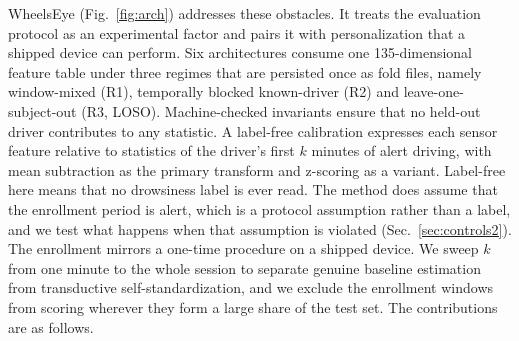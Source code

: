 \documentclass[journal]{IEEEtran}
\newcommand{\sysname}{WheelsEye}
\newcommand{\rone}{R1}
\newcommand{\rtwo}{R2}
\newcommand{\rthree}{R3}
\begin{document}
\sysname{} (Fig.~\ref{fig:arch}) addresses these obstacles. It treats the
evaluation protocol as an experimental factor and pairs it with
personalization that a shipped device can perform. Six architectures consume
one 135-dimensional feature table under three regimes that are persisted once
as fold files, namely window-mixed (\rone), temporally blocked known-driver
(\rtwo) and leave-one-subject-out (\rthree, LOSO). Machine-checked invariants
ensure that no held-out driver contributes to any statistic. A label-free
calibration expresses each sensor feature relative to statistics of the
driver's first $k$ minutes of alert driving, with mean subtraction as the
primary transform and z-scoring as a variant. Label-free here means that no
drowsiness label is ever read. The method does assume that the enrollment
period is alert, which is a protocol assumption rather than a label, and we
test what happens when that assumption is violated
(Sec.~\ref{sec:controls2}). The enrollment mirrors a one-time procedure on a
shipped device. We sweep $k$ from one minute to the whole
session to separate genuine baseline estimation from transductive
self-standardization, and we exclude the enrollment windows from scoring
wherever they form a large share of the test set. The contributions are as
follows.
\end{document}
